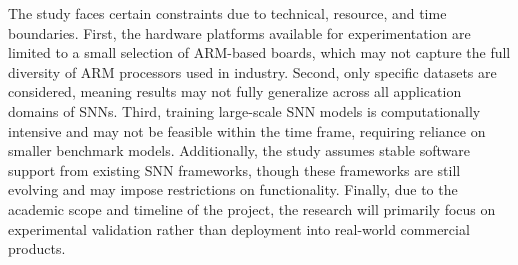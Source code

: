 The study faces certain constraints due to technical, resource, and time boundaries. First, the hardware platforms available for experimentation are limited to a small selection of ARM-based boards, which may not capture the full diversity of ARM processors used in industry. Second, only specific datasets are considered, meaning results may not fully generalize across all application domains of SNNs. Third, training large-scale SNN models is computationally intensive and may not be feasible within the time frame, requiring reliance on smaller benchmark models. Additionally, the study assumes stable software support from existing SNN frameworks, though these frameworks are still evolving and may impose restrictions on functionality. Finally, due to the academic scope and timeline of the project, the research will primarily focus on experimental validation rather than deployment into real-world commercial products.
